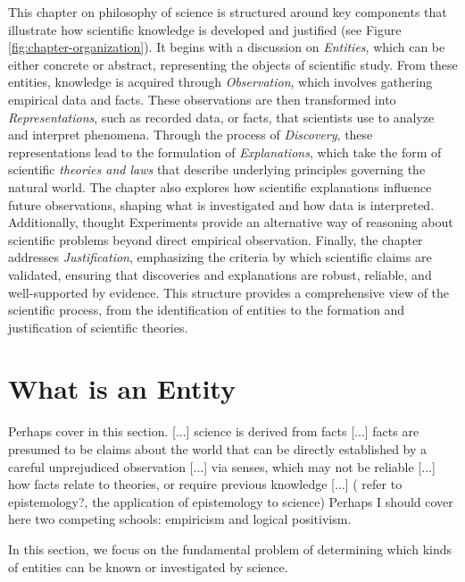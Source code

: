This chapter on philosophy of science is structured around key components that illustrate how scientific knowledge is developed and justified (see Figure \ref{fig:chapter-organization}). It begins with a discussion on \emph{Entities}, which can be either concrete or abstract, representing the objects of scientific study. From these entities, knowledge is acquired through \emph{Observation}, which involves gathering empirical data and facts. These observations are then transformed into \emph{Representations}, such as recorded data, or facts, that scientists use to analyze and interpret phenomena. Through the process of \emph{Discovery}, these representations lead to the formulation of \emph{Explanations}, which take the form of scientific \emph{theories and laws} that describe underlying principles governing the natural world. The chapter also explores how scientific explanations influence future observations, shaping what is investigated and how data is interpreted. Additionally, thought Experiments provide an alternative way of reasoning about scientific problems beyond direct empirical observation. Finally, the chapter addresses \emph{Justification}, emphasizing the criteria by which scientific claims are validated, ensuring that discoveries and explanations are robust, reliable, and well-supported by evidence. This structure provides a comprehensive view of the scientific process, from the identification of entities to the formation and justification of scientific theories.

%
%

\section{What is an Entity}
\label{sec:what-is-an-entity}

{\color{red} Perhaps cover in this section. [...] science is derived from facts [...] facts are presumed to be claims about the world that can be directly established by a careful unprejudiced observation [...] via senses, which may not be reliable [...] how facts relate to theories, or require previous knowledge [...] ( refer to epistemology?, the application of epistemology to science) Perhaps I should cover here two competing schools: empiricism and logical positivism. }

In this section, we focus on the fundamental problem of determining which kinds of entities can be known or investigated by science.

